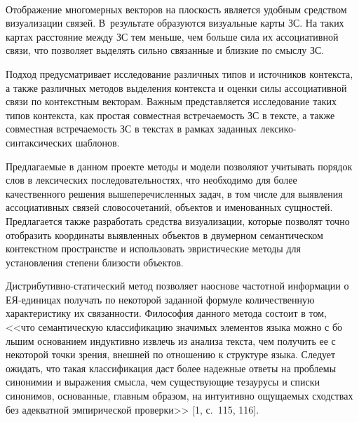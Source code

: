 \begin{multicols}{2}
\begin{figure*}[b] %
\vspace*{9pt}
 \begin{center}
 \mbox{%
 \epsfxsize=155mm
 }
 \end{center}
 \vspace*{-6pt}
\end{figure*}
     
     Отображение многомерных векторов на плоскость является удобным 
средством визуализации связей. В~результате образуются визуальные 
карты ЗС. На таких картах расстояние между ЗС 
тем меньше, чем больше сила их ассоциативной связи, что позволяет 
выделять сильно связанные и близкие по смыслу ЗС.
     
     Подход предусматривает исследование различных типов и 
источников контекста, а также различных методов выделения контекста и 
оценки силы ассоциативной связи по контекстным векторам. Важным 
представляется исследование таких типов контекста, как простая 
совместная встречаемость ЗС в тексте, а также совместная встречаемость 
ЗС в текстах в рамках заданных лек\-си\-ко-син\-так\-си\-че\-ских 
шаблонов.
     
     Предлагаемые в данном проекте методы и модели позволяют 
учитывать порядок слов в лексических последовательностях, что 
необходимо для более качественного решения вышеперечисленных задач, 
в том числе для выявления ассоциативных связей словосочетаний, 
объектов и именованных сущностей. Предлагается также разработать 
средства визуализации, которые позволят точно отоб\-ра\-зить координаты 
выявленных объектов в двумерном семантическом контекстном 
пространстве и использовать эвристические методы для уста\-нов\-ле\-ния 
степени близости объектов.
     
     Дистрибутивно-статический метод позволяет на\linebreak основе частотной 
информации о ЕЯ-еди\-ни\-цах полу\-чать по некоторой заданной формуле 
количественную характеристику их связанности. Философия данного 
метода состоит в том, <<что семантическую классификацию значимых 
элементов языка можно с б$\acute{\mbox{о}}$льшим основанием индуктивно извлечь из 
анализа текста, чем получить ее с некоторой точки зрения, внешней по 
отношению к структуре языка. Следует ожидать, что такая классификация 
даст более надежные ответы на проблемы синонимии и выражения смысла, 
чем существующие тезаурусы и списки синонимов, основанные, главным 
образом, на интуитивно ощущаемых сходствах без адекватной 
эмпирической проверки>> [1, с.~115, 116].
   

\end{multicols}
